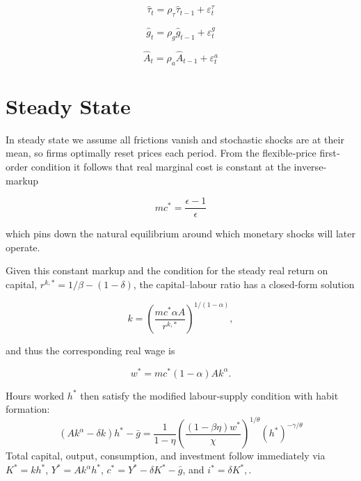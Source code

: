 \documentclass[11pt,preprint]{elsarticle}
\numberwithin{equation}{section}
\numberwithin{figure}{section}
\numberwithin{table}{section}
\begin{document}
\begin{equation}\label{real_taxes_linearised}
\hat{\tau}_t = \rho_\tau \hat{\tau}_{t-1} + \varepsilon_t^\tau
\end{equation}

\begin{equation}\label{gov_spending_linearised}
\hat{g}_t = \rho_g \hat{g}_{t-1} + \varepsilon_t^g
\end{equation}

\begin{equation}\label{technology_process_linearised}
\hat{A}_t = \rho_a \hat{A}_{t-1} + \varepsilon_t^a
\end{equation}

\endgroup

\section{Steady State}\label{steady-state}

In steady state we assume all frictions vanish and stochastic shocks are
at their mean, so firms optimally reset prices each period. From the
flexible‐price first‐order condition it follows that real marginal cost
is constant at the inverse‐markup

\begin{equation}\label{eq:mc}
mc^*=\frac{\epsilon-1}{\epsilon}
\end{equation}

which pins down the natural equilibrium around which monetary shocks
will later operate.

Given this constant markup and the condition for the steady real return
on capital, \(r^{k,*} = 1/\beta - (1-\delta)\), the capital--labour
ratio has a closed‐form solution

\begin{equation}
 k = \left(\frac{mc^*\alpha A}{r^{k,*}}\right)^{\!1/(1-\alpha)},
\end{equation}

and thus the corresponding real wage is

\begin{equation}
 w^* = mc^*(1-\alpha)Ak^\alpha.
\end{equation}

Hours worked \(h^*\) then satisfy the modified labour‐supply condition
with habit formation: \begin{equation}
 (Ak^\alpha - \delta k)h^* - \bar{g}
    = \frac{1}{1-\eta}\left(\frac{(1-\beta\eta)w^*}{\chi}\right)^{\!1/\theta}(h^*)^{-\gamma/\theta}
\end{equation} Total capital, output, consumption, and investment follow
immediately via \(K^* = kh^*\), \(Y^* = Ak^\alpha h^*\),
\(c^* = Y^* - \delta K^* - \bar{g}\), and \(i^* = \delta K^*,\).
\end{document}
